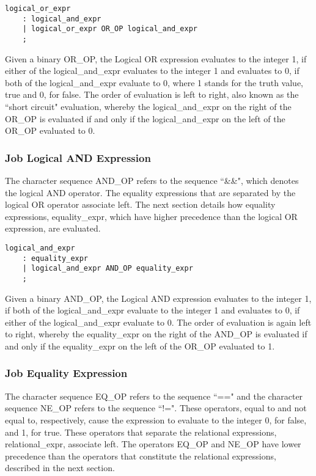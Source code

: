\documentclass[prodmode,acmtecs]{acmsmall}
\begin{document}
\begin{lstlisting}
logical_or_expr
	: logical_and_expr
	| logical_or_expr OR_OP logical_and_expr
	;
\end{lstlisting}

Given a binary OR\_OP, the Logical OR expression evaluates to the 
integer 1, if either of the logical\_and\_expr evaluates to the integer 
1 and evaluates to 0, if both of the logical\_and\_expr evaluate to 0, 
where 1 stands for the truth value, true and 0, for false. The order of 
evaluation is left to right, also known as the ``short circuit" 
evaluation, whereby the logical\_and\_expr on the right of the OR\_OP 
is evaluated if and only if the logical\_and\_expr on the left of the 
OR\_OP evaluated to 0. 

\subsubsection{Job Logical AND Expression}

The character sequence AND\_OP refers to the sequence ``\&\&", which 
denotes the logical AND operator. The equality expressions that are 
separated by the logical OR operator associate left. The next section 
details how equality expressions, equality\_expr, which have higher 
precedence than the logical OR expression, are evaluated. 

\begin{lstlisting}
logical_and_expr
	: equality_expr
	| logical_and_expr AND_OP equality_expr
	;
\end{lstlisting}

Given a binary AND\_OP, the Logical AND expression evaluates to the 
integer 1, if both of the logical\_and\_expr evaluate to the integer 1 
and evaluates to 0, if either of the logical\_and\_expr evaluate to 0. 
The order of evaluation is again left to right, whereby the 
equality\_expr on the right of the AND\_OP is evaluated if and only 
if the equality\_expr on the left of the OR\_OP evaluated to 1.

\subsubsection{Job Equality Expression}

The character sequence EQ\_OP refers to the sequence ``==" and the 
character sequence NE\_OP refers to the sequence ``!=". These operators, 
equal to and not equal to, respectively, cause the expression to 
evaluate to the integer 0, for false, and 1, for true.  These operators 
that separate the relational expressions, relational\_expr, associate 
left. The operators EQ\_OP and NE\_OP have lower precedence than the 
operators that constitute the relational expressions, described in the 
next section. 
\end{document}
